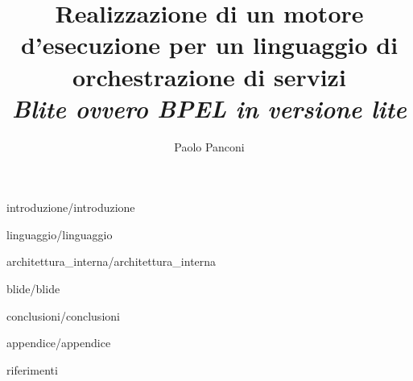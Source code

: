 \documentclass[a4paper,12pt, italian]{book}
\begin{document}
\sloppy

\title{\textsf{ \textbf{Realizzazione di un motore d'esecuzione per un
  linguaggio di orchestrazione di servizi} \\ 
  \em \large Blite ovvero BPEL in versione lite}\\ } 
  \author{Paolo Panconi}
 
\maketitle
\newpage

\tableofcontents

\listoffigures
\listoftables

%
%


%
{introduzione/introduzione}


%
{linguaggio/linguaggio}


%
{architettura_interna/architettura_interna}


%
{blide/blide}


%
{conclusioni/conclusioni}


%
{appendice/appendice}



%
{riferimenti}
\end{document}
